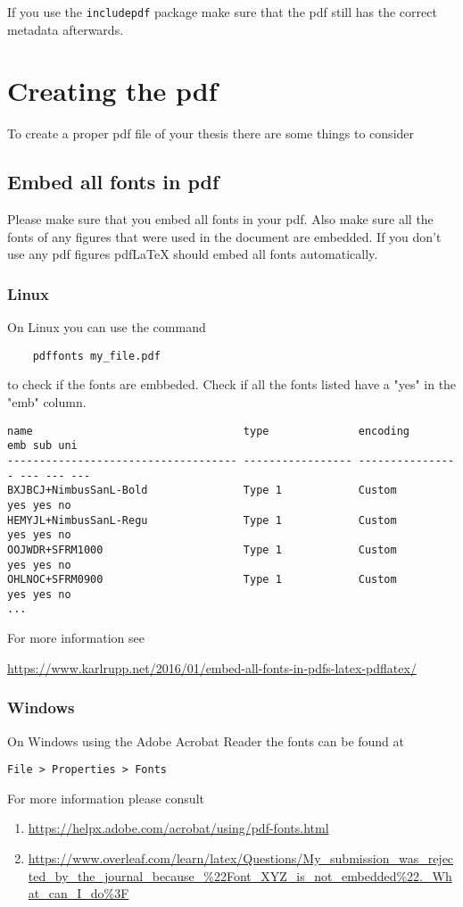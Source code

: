 If you use the \verb|includepdf| package make sure that the pdf still has the correct metadata afterwards.


\section{Creating the pdf}
To create a proper pdf file of your thesis there are some things to consider
\subsection{Embed all fonts in pdf}
Please make sure that you embed all fonts in your pdf. Also make sure all the fonts of any figures that were used in the document are embedded. 
If you don't use any pdf figures pdfLaTeX should embed all fonts automatically.

\subsubsection{Linux}
On Linux you can use the command \begin{verbatim}
    pdffonts my_file.pdf
\end{verbatim}
to check if the fonts are embbeded. Check if all the fonts listed have a "yes" in the "emb" column. 
\begin{verbatim}
name                                 type              encoding         emb sub uni 
------------------------------------ ----------------- ---------------- --- --- --- 
BXJBCJ+NimbusSanL-Bold               Type 1            Custom           yes yes no     
HEMYJL+NimbusSanL-Regu               Type 1            Custom           yes yes no     
OOJWDR+SFRM1000                      Type 1            Custom           yes yes no      
OHLNOC+SFRM0900                      Type 1            Custom           yes yes no   
...
\end{verbatim}
For more information see 

\url{https://www.karlrupp.net/2016/01/embed-all-fonts-in-pdfs-latex-pdflatex/}
\subsubsection{Windows}
On Windows using the Adobe Acrobat Reader the fonts can be found at
\begin{verbatim}
File > Properties > Fonts
\end{verbatim}
For more information please consult
\begin{enumerate}
\item \url{https://helpx.adobe.com/acrobat/using/pdf-fonts.html}

\item \url{https://www.overleaf.com/learn/latex/Questions/My_submission_was_rejected_by_the_journal_because_%22Font_XYZ_is_not_embedded%22._What_can_I_do%3F} 
\end{enumerate}

